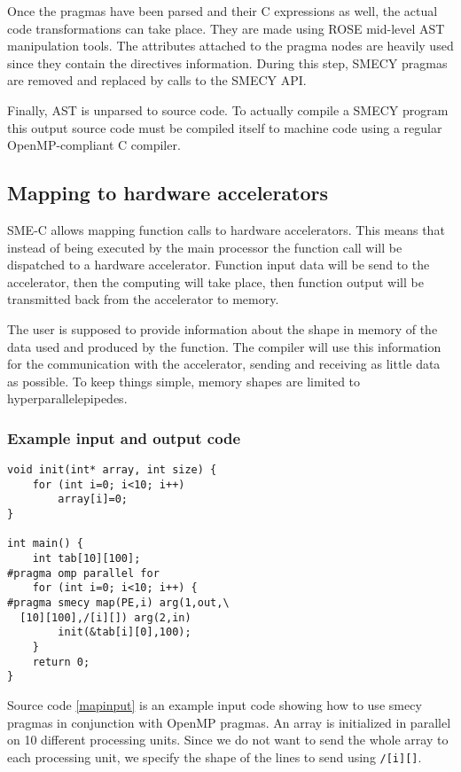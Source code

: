 \documentclass [A4]{article}
\begin{document}
	Once the pragmas have been parsed and their C expressions as well, the actual code transformations can take place. They are made using ROSE mid-level AST manipulation tools. The attributes attached to the pragma nodes are heavily used since they contain the directives information. During this step, SMECY pragmas are removed and replaced by calls to the SMECY API.
	
	Finally, AST is unparsed to source code. To actually compile a SMECY program this output source code must be compiled itself to machine code using a regular OpenMP-compliant C compiler.
	
	
	\subsection{Mapping to hardware accelerators}
	SME-C allows mapping function calls to hardware accelerators. This means that instead of being executed by the main processor the function call will be dispatched to a hardware accelerator. Function input data will be send to the accelerator, then the computing will take place, then function output will be transmitted back from the accelerator to memory.
	
	The user is supposed to provide information about the shape in memory of the data used and produced by the function. The compiler will use this information for the communication with the accelerator, sending and receiving as little data as possible. To keep things simple, memory shapes are limited to hyperparallelepipedes.
	
	\subsubsection{Example input and output code}
	
	\begin{lstlisting}[label=mapinput,caption={Input code with hardware mapping pragma}]
void init(int* array, int size) {
	for (int i=0; i<10; i++)
		array[i]=0;
}

int main() {
	int tab[10][100];
#pragma omp parallel for
	for (int i=0; i<10; i++) {
#pragma smecy map(PE,i) arg(1,out,\
  [10][100],/[i][]) arg(2,in)
		init(&tab[i][0],100);
	}
	return 0;
}
	\end{lstlisting}
	
	Source code \ref{mapinput} is an example input code showing how to use smecy pragmas in conjunction with OpenMP pragmas. An array is initialized in parallel on 10 different processing units. Since we do not want to send the whole array to each processing unit, we specify the shape of the lines to send using \verb+/[i][]+.
	
\end{document}
